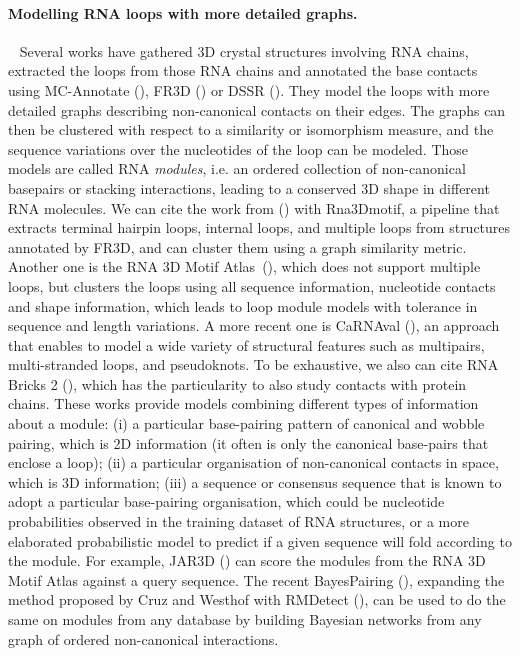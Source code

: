 \documentclass{bioinfo}
\begin{document}
\paragraph{Modelling RNA loops with more detailed graphs.} ~  Several works have gathered 3D crystal structures involving RNA chains, extracted the loops from those RNA chains and annotated the base contacts using MC-Annotate (\citealp{gendron2001quantitative}), FR3D (\citealp{sarver_fr3d:_2008}) or DSSR (\citealp{lu_dssr:_2015}). They model the loops with more detailed graphs describing non-canonical contacts on their edges. The graphs can then be clustered with respect to a similarity or isomorphism measure, and the sequence variations over the nucleotides of the loop can be modeled. Those models are called RNA \textit{modules}, i.e. an ordered collection of non-canonical basepairs or stacking interactions, leading to a conserved 3D shape in different RNA molecules. We can cite the work from (\citealp{djelloul_automated_2008}) with Rna3Dmotif, a pipeline that extracts terminal hairpin loops, internal loops, and multiple loops from structures annotated by FR3D, and can cluster them using a graph similarity metric. Another one is the RNA 3D Motif Atlas~(\citealp{petrov_automated_2013}), which does not support multiple loops, but clusters the loops using all sequence information, nucleotide contacts and shape information, which leads to loop module models with tolerance in sequence and length variations. A more recent one is CaRNAval (\citealp{reinharz2018mining}), an approach that enables to model a wide variety of structural features such as multipairs, multi-stranded loops, and  pseudoknots. To be exhaustive, we also can cite RNA Bricks 2 (\citealp{chojnowski2014rna}), which has the particularity to also study contacts with protein chains.%
These works provide models combining different types of information about a module: (i) a particular base-pairing pattern of canonical and wobble pairing, which is 2D information (it often is only the canonical base-pairs that enclose a loop); (ii) a particular organisation of non-canonical contacts in space, which is 3D information;  (iii) a sequence or consensus sequence that is known to adopt a particular base-pairing organisation, which could be nucleotide probabilities observed in the training dataset of RNA structures, or a more elaborated probabilistic model to predict if a given sequence will fold according to the module.
For example, JAR3D (\citealp{zirbel_identifying_2015}) can score the modules from the RNA 3D Motif Atlas against a query sequence. The recent BayesPairing (\citealp{sarrazin2019automated}), expanding the method proposed by Cruz and Westhof with RMDetect (\citealp{cruz2011sequence}), can be used to do the same on modules from any database by building Bayesian networks from any graph of ordered non-canonical interactions.
\end{document}
